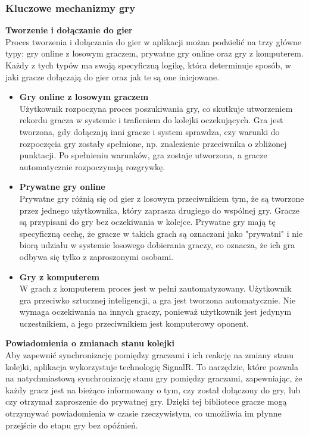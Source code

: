 \documentclass[twoside]{projektInzynierskiMS1}
\begin{document}
\newpage

\subsubsection{Kluczowe mechanizmy gry}

\noindent \textbf{Tworzenie i dołączanie do gier}\\
Proces tworzenia i dołączania do gier w aplikacji można podzielić na trzy główne typy: gry online z losowym graczem, prywatne gry online oraz gry z komputerem. Każdy z tych typów ma swoją specyficzną logikę, która determinuje sposób, w jaki gracze dołączają do gier oraz jak te są one inicjowane.

\begin{itemize}
    \item \textbf{Gry online z losowym graczem}\\
    Użytkownik rozpoczyna proces poszukiwania gry, co skutkuje utworzeniem rekordu gracza w systemie i trafieniem do kolejki oczekujących. Gra jest tworzona, gdy dołączają inni gracze i system sprawdza, czy warunki do rozpoczęcia gry zostały spełnione, np. znalezienie przeciwnika o zbliżonej punktacji. Po spełnieniu warunków, gra zostaje utworzona, a gracze automatycznie rozpoczynają rozgrywkę.
    
    \item \textbf{Prywatne gry online}\\
    Prywatne gry różnią się od gier z losowym przeciwnikiem tym, że są tworzone przez jednego użytkownika, który zaprasza drugiego do wspólnej gry. Gracze są przypisani do gry bez oczekiwania w kolejce. Prywatne gry mają tę specyficzną cechę, że gracze w takich grach są oznaczani jako "prywatni" i nie biorą udziału w systemie losowego dobierania graczy, co oznacza, że ich gra odbywa się tylko z zaproszonymi osobami.

    \item \textbf{Gry z komputerem}\\
    W grach z komputerem proces jest w pełni zautomatyzowany. Użytkownik gra przeciwko sztucznej inteligencji, a gra jest tworzona automatycznie. Nie wymaga oczekiwania na innych graczy, ponieważ użytkownik jest jedynym uczestnikiem, a jego przeciwnikiem jest komputerowy oponent.

\end{itemize}

\noindent \textbf{Powiadomienia o zmianach stanu kolejki}\\
Aby zapewnić synchronizację pomiędzy graczami i ich reakcję na zmiany stanu kolejki, aplikacja wykorzystuje technologię SignalR. To narzędzie, które pozwala na natychmiastową synchronizację stanu gry pomiędzy graczami, zapewniając, że każdy gracz jest na bieżąco informowany o tym, czy został dołączony do gry, lub czy otrzymał zaproszenie do prywatnej gry. Dzięki tej bibliotece gracze mogą otrzymywać powiadomienia w czasie rzeczywistym, co umożliwia im płynne przejście do etapu gry bez opóźnień.
\end{document}
